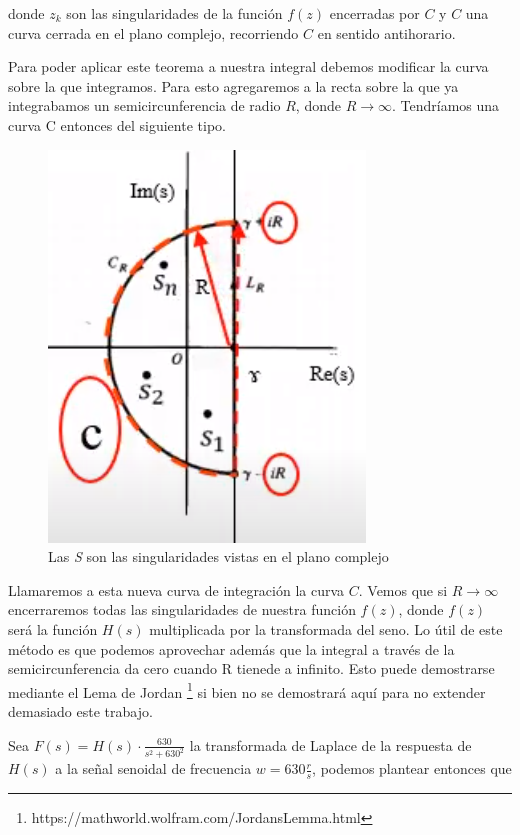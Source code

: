 \documentclass[11pt,a4paper]{report}
\begin{document}
donde $z_{k}$ son las singularidades de la función $f(z)$ encerradas por $C$ y $C$ una curva cerrada en el plano complejo, recorriendo $C$ en sentido antihorario.

\bigskip
Para poder aplicar este teorema a nuestra integral debemos modificar la curva sobre la que integramos. Para esto agregaremos a la recta sobre la que ya integrabamos un semicircunferencia de radio $R$, donde $R\longrightarrow \infty$. Tendríamos una curva C entonces del siguiente tipo.

\begin{figure}[h!]
\centering
\includegraphics[scale=0.9]{diagramaBromwich2.png}
\caption{Las \textit{S} son las singularidades vistas en el plano complejo}
\end{figure}
\clearpage

Llamaremos a esta nueva curva de integración la curva $C$. Vemos que si $R\longrightarrow \infty$ encerraremos todas las singularidades de nuestra función $f(z)$, donde $f(z)$ será la función $H(s)$ multiplicada por la transformada del seno. Lo útil de este método es que podemos aprovechar además que la integral a través de la semicircunferencia da cero cuando R tienede a infinito. Esto puede demostrarse mediante el Lema de Jordan \footnote{https://mathworld.wolfram.com/JordansLemma.html} si bien no se demostrará aquí para no extender demasiado este trabajo. 

\bigskip
Sea $F(s) = H(s) \cdot \frac{630}{s^2 + 630^2}$ la transformada de Laplace de la respuesta de $H(s)$ a la señal senoidal de frecuencia $w = 630\frac{r}{s}$, podemos plantear entonces que
\end{document}
